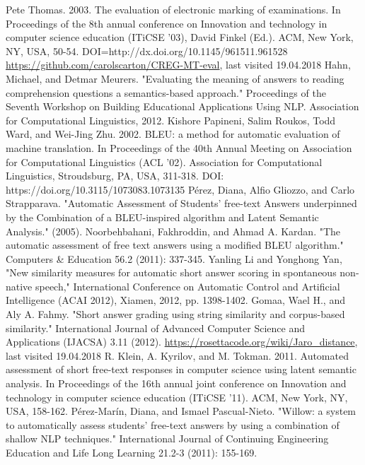 \documentclass[rnd]{mas_report}
\begin{document}
\begin{thebibliography}{3}
 Pete Thomas. 2003. The evaluation of electronic marking of examinations. In Proceedings of the 8th annual conference on Innovation and technology in computer science education (ITiCSE '03), David Finkel (Ed.). ACM, New York, NY, USA, 50-54. DOI=http://dx.doi.org/10.1145/961511.961528
 \url{https://github.com/carolscarton/CREG-MT-eval}, last visited 19.04.2018
 Hahn, Michael, and Detmar Meurers. "Evaluating the meaning of answers to reading comprehension questions a semantics-based approach." Proceedings of the Seventh Workshop on Building Educational Applications Using NLP. Association for Computational Linguistics, 2012.
 Kishore Papineni, Salim Roukos, Todd Ward, and Wei-Jing Zhu. 2002. BLEU: a method for automatic evaluation of machine translation. In Proceedings of the 40th Annual Meeting on Association for Computational Linguistics (ACL '02). Association for Computational Linguistics, Stroudsburg, PA, USA, 311-318. DOI: https://doi.org/10.3115/1073083.1073135
 Pérez, Diana, Alfio Gliozzo, and Carlo Strapparava. "Automatic Assessment of Students’ free-text Answers underpinned by the Combination of a BLEU-inspired algorithm and Latent Semantic Analysis." (2005).
 Noorbehbahani, Fakhroddin, and Ahmad A. Kardan. "The automatic assessment of free text answers using a modified BLEU algorithm." Computers \& Education 56.2 (2011): 337-345.
 Yanling Li and Yonghong Yan, "New similarity measures for automatic short answer scoring in spontaneous non-native speech," International Conference on Automatic Control and Artificial Intelligence (ACAI 2012), Xiamen, 2012, pp. 1398-1402.
 Gomaa, Wael H., and Aly A. Fahmy. "Short answer grading using string similarity and corpus-based similarity." International Journal of Advanced Computer Science and Applications (IJACSA) 3.11 (2012).
 \url{https://rosettacode.org/wiki/Jaro_distance}, last visited 19.04.2018
 R. Klein, A. Kyrilov, and M. Tokman. 2011. Automated assessment of short free-text responses in computer science using latent semantic analysis. In Proceedings of the 16th annual joint conference on Innovation and technology in computer science education (ITiCSE '11). ACM, New York, NY, USA, 158-162.
 Pérez-Marín, Diana, and Ismael Pascual-Nieto. "Willow: a system to automatically assess students’ free-text answers by using a combination of shallow NLP techniques." International Journal of Continuing Engineering Education and Life Long Learning 21.2-3 (2011): 155-169.

\end{thebibliography}
\end{document}
